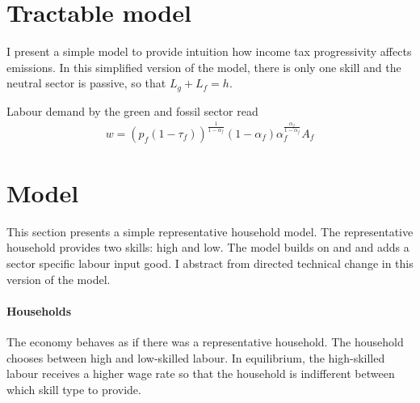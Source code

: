 
\section{Tractable model}
I present a simple model to provide intuition how income tax progressivity affects emissions. In this simplified version of the model, there is only one skill and the neutral sector is passive, so that $L_g+L_f=h$. 

Labour demand by the green and fossil sector read
\begin{align*}
w=(p_f(1-\tau_f))^{\frac{1}{1-\alpha_f}}(1-\alpha_f)\alpha_f^{\frac{\alpha_f}{1-\alpha_f}}A_f
\end{align*}


\section{Model}
This section presents a simple representative household model. The representative household provides two skills: high and low. 
The model builds on \cite{Acemoglu2012TheChange} and \cite{Heathcote2017OptimalFramework} and adds a sector specific labour input good. I abstract from directed technical change in this version of the model.

\paragraph{Households}
The economy behaves as if there was a representative household. The household chooses between high and low-skilled labour.  In equilibrium, the high-skilled labour receives a higher wage rate so that the household is indifferent between which skill type to provide.

